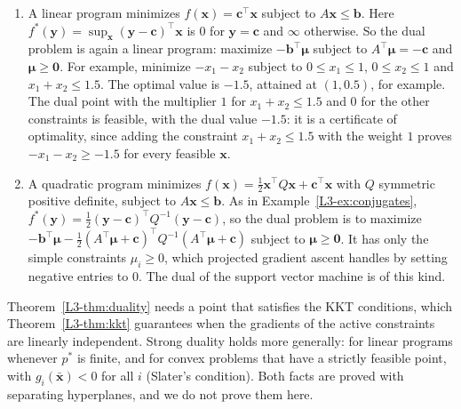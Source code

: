 \begin{example}\label{L3-ex:lp-qp}
    \begin{enumerate}
        \item A linear program minimizes $f(\mathbf{x}) = \mathbf{c}^\top\mathbf{x}$ subject to $A\mathbf{x} \leq \mathbf{b}$. Here $f^*(\mathbf{y}) = \sup_{\mathbf{x}}(\mathbf{y} - \mathbf{c})^\top\mathbf{x}$ is $0$ for $\mathbf{y} = \mathbf{c}$ and $\infty$ otherwise. So the dual problem is again a linear program: maximize $-\mathbf{b}^\top\boldsymbol{\mu}$ subject to $A^\top\boldsymbol{\mu} = -\mathbf{c}$ and $\boldsymbol{\mu} \geq \mathbf{0}$. For example, minimize $-x_1 - x_2$ subject to $0 \leq x_1 \leq 1$, $0 \leq x_2 \leq 1$ and $x_1 + x_2 \leq 1.5$. The optimal value is $-1.5$, attained at $(1, 0.5)$, for example. The dual point with the multiplier $1$ for $x_1 + x_2 \leq 1.5$ and $0$ for the other constraints is feasible, with the dual value $-1.5$: it is a certificate of optimality, since adding the constraint $x_1 + x_2 \leq 1.5$ with the weight $1$ proves $-x_1 - x_2 \geq -1.5$ for every feasible $\mathbf{x}$.
        \item A quadratic program minimizes $f(\mathbf{x}) = \frac{1}{2}\mathbf{x}^\top Q\mathbf{x} + \mathbf{c}^\top\mathbf{x}$ with $Q$ symmetric positive definite, subject to $A\mathbf{x} \leq \mathbf{b}$. As in Example~\ref{L3-ex:conjugates}, $f^*(\mathbf{y}) = \frac{1}{2}(\mathbf{y} - \mathbf{c})^\top Q^{-1}(\mathbf{y} - \mathbf{c})$, so the dual problem is to maximize $-\mathbf{b}^\top\boldsymbol{\mu} - \frac{1}{2}(A^\top\boldsymbol{\mu} + \mathbf{c})^\top Q^{-1}(A^\top\boldsymbol{\mu} + \mathbf{c})$ subject to $\boldsymbol{\mu} \geq \mathbf{0}$. It has only the simple constraints $\mu_i \geq 0$, which projected gradient ascent handles by setting negative entries to $0$. The dual of the support vector machine is of this kind.
    \end{enumerate}
\end{example}

\begin{remark}
    Theorem~\ref{L3-thm:duality} needs a point that satisfies the KKT conditions, which Theorem~\ref{L3-thm:kkt} guarantees when the gradients of the active constraints are linearly independent. Strong duality holds more generally: for linear programs whenever $p^*$ is finite, and for convex problems that have a strictly feasible point, with $g_i(\bar{\mathbf{x}}) < 0$ for all $i$ (Slater's condition). Both facts are proved with separating hyperplanes, and we do not prove them here.
\end{remark}

